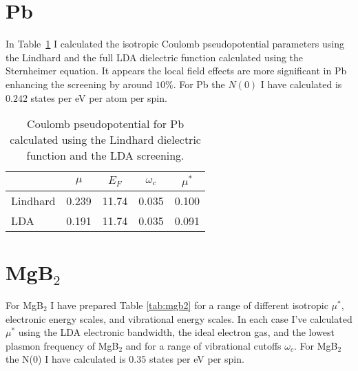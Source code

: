 \documentclass{article}
\begin{document}
\section{Pb}
In Table~\ref{tab:pb} I calculated the isotropic
Coulomb pseudopotential parameters using the Lindhard
and the full LDA dielectric function calculated using
the Sternheimer equation. It appears the local field
effects are more significant in Pb enhancing the screening 
by around $10\%$. For Pb the $N(0)$ I have calculated is
$0.242$ states per eV per atom per spin.

\begin{table}
\begin{center}
\begin{tabular}{l c c c c}
             & $\mu$  & $E_{F}$  & $\omega_{c}$  & $\mu^{*}$ \\
\hline
Lindhard     & 0.239  & 11.74    & 0.035         & 0.100 \\
LDA          & 0.191  & 11.74    & 0.035         & 0.091 \\ 
\end{tabular}
\caption{Coulomb pseudopotential for Pb calculated using
the Lindhard dielectric function and the LDA screening.\label{tab:pb}}
\end{center}
\end{table}

%
%

\section{MgB$_{2}$}
For MgB$_{2}$ I have prepared Table \ref{tab:mgb2} for a range of different
isotropic $\mu^{*}$, electronic energy scales, and
vibrational energy scales. In each case I've calculated $\mu^*$ using
the LDA electronic bandwidth, the ideal electron gas, and the
lowest plasmon frequency of MgB$_2$ and for a range of vibrational
cutoffs $\omega_{c}$. For MgB$_2$ the N(0) I have calculated is
$0.35$ states per eV per spin.
\end{document}
